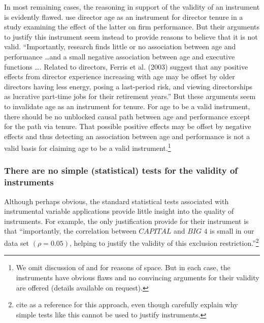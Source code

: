 \documentclass[11pt,reqno]{amsart}
\begin{document}
In most remaining cases, the reasoning in support of the validity of an instrument is evidently flawed. \citet{Kim:2014fm} use director age as an instrument for director tenure in a study examining the effect of the latter on firm performance. 
But their arguments to justify this instrument seem instead to provide reasons to believe that it is not valid. 
``Importantly, research finds little or no association between age and performance \dots and a small negative association between age and executive functions \dots. 
Related to directors, Ferris et al. (2003) suggest that any positive effects from director experience increasing with age may be offset by older directors having less energy, posing a last-period risk, and viewing directorships as lucrative part-time jobs for their retirement years.'' 
But these arguments seem to invalidate age as an instrument for tenure. 
For age to be a valid instrument, there should be no unblocked causal path between age and performance except for the path via tenure.
 That possible positive effects may be offset by negative effects and thus detecting an association between age and performance is not a valid basis for claiming age to be a valid instrument.\footnote{
We omit discussion of  \citet{Erkens:2014hj,Houston:2014hv} and \citet{deFranco:2014ct} for reasons of space. But in each case, the instruments have obvious flaws and no convincing arguments for their validity are offered (details available on request).}

\subsubsection{There are no simple (statistical) tests for the validity of instruments}
Although perhaps obvious, the standard statistical tests associated with instrumental variable applications provide little insight into the quality of instruments. 
For example, the only justification \citet{Guedhami:2013cj} provide for their instrument is that ``importantly, the correlation between $\textit{CAPITAL}$ and $\textit{BIG 4}$ is small in our data set $(\rho = 0.05)$, helping to justify the validity of this exclusion restriction.''\footnote{
 \citet{Guedhami:2013cj} cite \citet{Larcker:2010fq} as a reference for this approach, even though \citet{Larcker:2010fq} carefully explain why simple tests like this cannot be used to justify instruments.}
\end{document}
